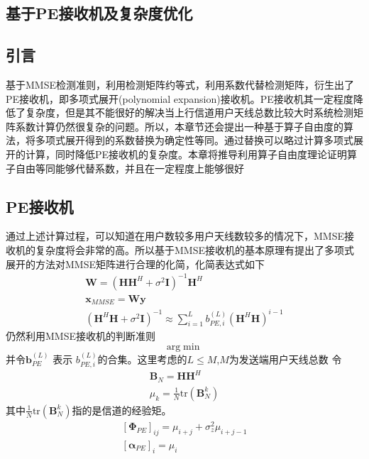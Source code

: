 \documentclass[bachelor,nocolorlinks, printoneside]{seuthesis} %
\begin{document}
\begin{Main}
\chapter{基于PE接收机及复杂度优化}
\section{引言}
基于MMSE检测准则，利用检测矩阵约等式，利用系数代替检测矩阵，衍生出了PE接收机，即多项式展开(polynomial expansion)接收机。PE接收机其一定程度降低了复杂度，但是其不能很好的解决当上行信道用户天线总数比较大时系统检测矩阵系数计算仍然很复杂的问题。所以，本章节还会提出一种基于算子自由度的算法，将多项式展开得到的系数替换为确定性等同。通过替换可以略过计算多项式展开的计算，同时降低PE接收机的复杂度。本章将推导利用算子自由度理论证明算子自由等同能够代替系数，并且在一定程度上能够很好
\section{PE接收机}
通过上述计算过程，可以知道在用户数较多用户天线数较多的情况下，MMSE接收机的复杂度将会非常的高。所以基于MMSE接收机的基本原理有提出了多项式展开的方法对MMSE矩阵进行合理的化简，化简表达式如下
\begin{gather}\label{key}
\mathbf{W} = (\mathbf{H}\mathbf{H}^H + \sigma^2 \mathbf{I})^{-1}\mathbf{H}^H  \nonumber \\
\mathbf{x}_{MMSE} = \mathbf{W} \mathbf{y}  \nonumber \\
(\mathbf{H}^H\mathbf{H}+\sigma^2\mathbf{I})^{-1} \approx \sum_{i=1}^{L} b_{PE,i}^{(L)}(\mathbf{H}^H\mathbf{H})^{i-1}
\end{gather}
仍然利用MMSE接收机的判断准则
\begin{equation}\label{key}
\mathrm{arg} \min
\end{equation}
并令$\mathbf{b}^{(L)}_{PE}$ 表示 $b_{PE,i}^{(L)}$的合集。这里考虑的$L \leq M$,$M$为发送端用户天线总数
令
\begin{gather}\label{key}
\mathbf{B}_N = \mathbf{H}\mathbf{H}^H \nonumber \\
\mu_k = \frac{1}{N} \mathrm{tr}(\mathbf{B}_N^k) \nonumber
\end{gather}
其中$\frac{1}{N} \mathrm{tr}(\mathbf{B}_N^k)$指的是信道的经验矩。
\begin{gather}\label{key}
[\mathbf{\Phi}_{PE}]_{ij} = \mu_{i+j} + \sigma_{z}^2 \mu_{i+j-1} \nonumber \\
\left[\mathbf{\alpha}_{PE}\right]_i = \mu_i
\end{gather}


\end{Main}
\end{document}
